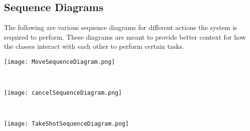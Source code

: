 \documentclass[titlepage]{article}
\begin{document}
\subsection{Sequence Diagrams}
The following are various sequence diagrams for different actions the system is required to perform. These diagrams are meant to provide better context for how the classes interact with each other to perform certain tasks.\vfill
\begin{center}
	\texttt{[image: MoveSequenceDiagram.png]}
\label{fig:MoveSequenceDiagram}
\end{center}
~\vfill
\begin{center}
	\texttt{[image: cancelSequenceDiagram.png]}
\label{fig:CancelSequenceDiagram}
\end{center}
~\vfill
\newpage

\begin{sidewaysfigure}
	\begin{center}
		\texttt{[image: TakeShotSequenceDiagram.png]}
	\label{fig:TakeShotSequenceDiagram}
	\end{center}
\end{sidewaysfigure}
\end{document}
